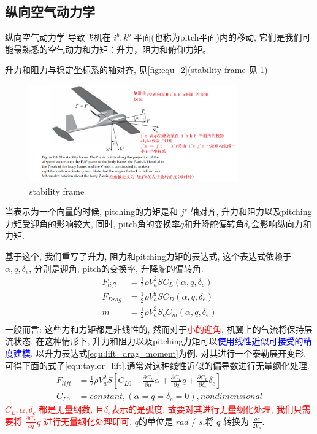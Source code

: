 \documentclass[UTF8,a4paper,10pt,nocolorlinks]{ctexart}
\begin{document}
    \subsection{纵向空气动力学}
    纵向空气动力学 导致飞机在 $i^{b}, k^{b}$ 平面(也称为pitch平面)内的移动, 
    它们是我们可能最熟悉的空气动力和力矩：升力，阻力和俯仰力矩。
    \par
    升力和阻力与稳定坐标系的轴对齐, 见\ref{fig:equ_2}(stability frame 见 \ref{fig:stable})
    \begin{figure}
      \centering
      \includegraphics[width=0.8\textwidth]{picture/stability_frame.png}
      \caption{stability frame}
      \label{fig:stable}
    \end{figure}
    当表示为一个向量的时候, pitching的力矩是和 $j^{s}$ 轴对齐, 升力和阻力以及pitching力矩受迎角的影响较大, 同时, pitch角的变换率$q$和升降舵偏转角$\delta_{e}$会影响纵向力和力矩. \par
    基于这个, 我们重写了升力, 阻力和pitching力矩的表达式, 这个表达式依赖于 $\alpha, q, \delta_{e}$, 分别是迎角, pitch的变换率, 升降舵的偏转角. 
    \begin{equation}
      \begin{split}
      F_{lift} &= \frac{1}{2} \rho V_{a}^{2}SC_{L}(\alpha, q, \delta_{e}) \\
      F_{Drag} &= \frac{1}{2} \rho V_{a}^{2}SC_{D}(\alpha, q, \delta_{e}) \\
      m &= \frac{1}{2} \rho V_{a}^{2}S_{c}C_{m}(\alpha, q, \delta_{e}) \\
      \label{equ:lift_drag_moment}
    \end{split}
  \end{equation}
  一般而言: 这些力和力矩都是非线性的, 然而对于\textcolor{red}{小的迎角}, 机翼上的气流将保持层流状态, 
  在这种情形下, 升力和阻力以及pitching力矩可以\textcolor{blue}{使用线性近似可接受的精度建模}. 
  以升力表达式\ref{equ:lift_drag_moment}为例, 对其进行一个泰勒展开变形. 可得下面的式子\ref{equ:taylor_lift}.通常对这种线性近似的偏导数进行无量纲化处理.
  \begin{align}
    F_{lift} &= \frac{1}{2} \rho V_{a}^{2} S \left[ C_{L0} + \frac{\partial C_{L}}{\partial \alpha} \alpha +  \frac{\partial C_{L}}{\partial q} q + \frac{\partial C_{L}}{\partial \delta_{e}} \delta_{e} \right] \\
    C_{L0} &= constant, (\alpha = q = \delta_{e} = 0), nondimensional
    \label{equ:taylor_lift}
  \end{align}
  \textcolor{red}{$C_{L}, \alpha, \delta_{e}$ 都是无量纲数, 且$\delta_{e}$表示的是弧度, 故要对其进行无量纲化处理, 我们只需要将 $ \frac{\partial C_{L}}{\partial q} q$ 进行无量纲化处理即可}. 
  $q$的单位是 $rad$ / $s$,将 $q$ 转换为 $\frac{qc}{2V_{a}}$. 
  
\end{document}
